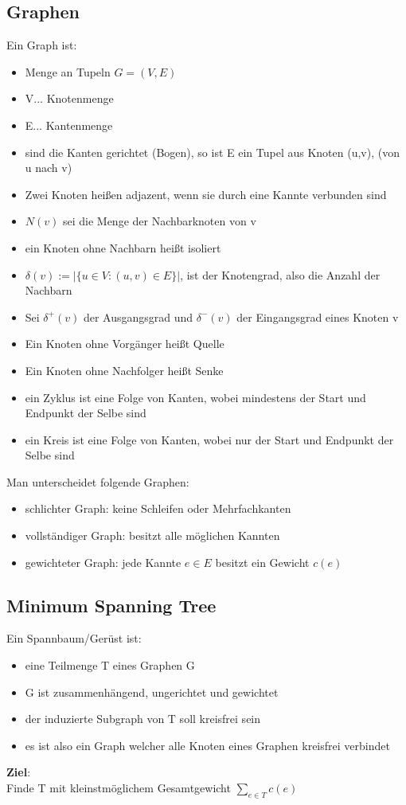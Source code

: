 \documentclass[12pt,a4paper, hyperref]{article}
\begin{document}
\subsection{Graphen}
Ein Graph ist:
\begin{itemize}
\item Menge an Tupeln $G=(V, E)$
\item V... Knotenmenge
\item E... Kantenmenge
\item sind die Kanten gerichtet (Bogen), so ist E ein Tupel aus Knoten (u,v), (von u nach v)
\item Zwei Knoten heißen adjazent, wenn sie durch eine Kannte verbunden sind
\item $N(v)$ sei die Menge der Nachbarknoten von v
\item ein Knoten ohne Nachbarn heißt isoliert
\item $\delta (v) := |\{u \in V: (u, v) \in E\}|$, ist der Knotengrad, also die Anzahl der Nachbarn
\item Sei $\delta^+(v)$ der Ausgangsgrad und $\delta^-(v)$ der Eingangsgrad eines Knoten v
\item Ein Knoten ohne Vorgänger heißt Quelle
\item Ein Knoten ohne Nachfolger heißt Senke
\item ein Zyklus ist eine Folge von Kanten, wobei mindestens der Start und Endpunkt der Selbe sind
\item ein Kreis ist eine Folge von Kanten, wobei nur der Start und Endpunkt der Selbe sind
\end{itemize}
Man unterscheidet folgende Graphen:
\begin{itemize}
\item schlichter Graph: keine Schleifen oder Mehrfachkanten
\item vollständiger Graph: besitzt alle möglichen Kannten
\item gewichteter Graph: jede Kannte $e \in E$ besitzt ein Gewicht $c(e)$
\end{itemize}

\subsection{Minimum Spanning Tree}
Ein Spannbaum/Gerüst ist:
\begin{itemize}
\item eine Teilmenge T eines Graphen G
\item G ist zusammenhängend, ungerichtet und gewichtet
\item der induzierte Subgraph von T soll kreisfrei sein
\item es ist also ein Graph welcher alle Knoten eines Graphen kreisfrei verbindet
\end{itemize}
\textbf{Ziel}:\\
Finde T mit kleinstmöglichem Gesamtgewicht $\sum_{e\in T} c(e)$
\end{document}
